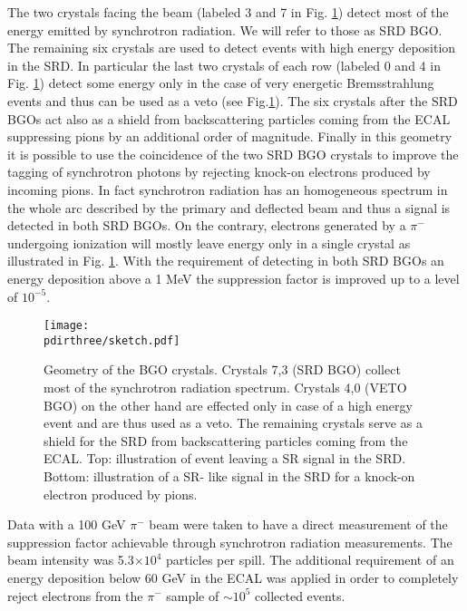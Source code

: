 
The two crystals facing the beam (labeled 3 and 7 in Fig. \ref{fig:newgeo}) detect most of the energy emitted by synchrotron radiation. We will refer to those as SRD BGO. The remaining six crystals are used to detect events with high energy deposition in the SRD. In particular the last two crystals of each row (labeled 0 and 4 in Fig. \ref{fig:newgeo}) detect some energy only in the case of very energetic Bremsstrahlung events and thus can be used as a veto (see Fig.\ref{fig:newgeo}). The six crystals after the SRD BGOs act also as a shield from backscattering particles coming from the ECAL suppressing pions by an additional order of magnitude. Finally in this geometry it is possible to use the coincidence of the two SRD BGO crystals to improve the tagging of synchrotron photons by rejecting knock-on electrons produced by incoming pions. In fact synchrotron radiation has an homogeneous spectrum in the whole arc described by the primary and deflected beam and thus a signal is detected in both SRD BGOs. On the contrary, electrons generated by a $\pi^-$ undergoing ionization will mostly leave energy only in a single crystal as illustrated in Fig. \ref{fig:newgeo}. 
With the requirement of detecting in both SRD BGOs an energy deposition above a 1 MeV the suppression factor is improved up to a level of $10^{-5}$.



\begin{figure}[htb!]
  \centering
  \texttt{[image: \\pdirthree/sketch.pdf]}
  \caption[Geometry of the BGO crystals]{Geometry of the BGO crystals. Crystals 7,3 (SRD BGO) collect most of the synchrotron radiation spectrum. Crystals 4,0 (VETO BGO) on the other hand are effected only in case of a high energy event and are thus used as a veto. The remaining crystals serve as a shield for the SRD from backscattering particles coming from the ECAL. Top: illustration of event leaving a SR signal in the SRD. Bottom: illustration of a SR- like signal in the SRD for a knock-on electron produced by pions.}
\label{fig:newgeo}
\end{figure}

Data with a 100 GeV $\pi^-$ beam were taken to have a direct measurement of the suppression factor achievable through synchrotron radiation measurements. The beam intensity was 5.3$\times 10^4$ particles per spill. The additional requirement of an energy deposition below 60 GeV in the ECAL was applied in order to completely reject electrons from the $\pi^-$ sample of $\sim 10^5$ collected events.

